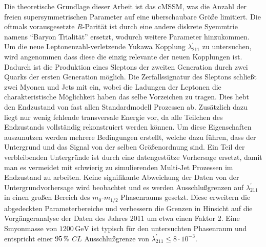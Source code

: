 \documentclass[11pt,a4paper,twoside,openright,DIV=13,BCOR=1cm]{scrbook} %
\numberwithin{equation}{chapter} %
\numberwithin{figure}{chapter} %
\numberwithin{table}{chapter} %
\newcommand{\pct}{\scalebox{.9}{\%}}
\begin{document}
Die theoretische Grundlage dieser Arbeit ist das cMSSM, was die Anzahl der freien supersymmetrischen Parameter auf eine überschaubare Größe limitiert. Die oftmals vorausgesetzte $R$-Parität ist durch eine andere diskrete Syemmtrie namens ``Baryon Trialität'' ersetzt, wodurch weitere Parameter hinzukommen. Um die neue Leptonenzahl-verletzende Yukawa Kopplung $\lambda^\prime_{211}$ zu untersuchen, wird angenommen dass diese die einzig relevante der neuen Kopplungen ist. Dadurch ist die Produktion eines Sleptons der zweiten Generation durch zwei Quarks der ersten Generation möglich. Die Zerfallssignatur des Sleptons schließt zwei Myonen und Jets mit ein, wobei die Ladungen der Leptonen die charakteristische Möglichkeit haben das selbe Vorzeichen zu tragen. Dies hebt den Endzustand von fast allen Standardmodell Prozessen ab. Zusätzlich dazu liegt nur wenig fehlende transversale Energie vor, da alle Teilchen des Endzustands vollständig rekonstruiert werden können. Um diese Eigenschaften auszunutzen werden mehrere Bedingungen erstellt, welche dazu führen, dass der Untergrund und das Signal von der selben Größenordnung sind. Ein Teil der verbleibenden Untergründe ist durch eine datengestütze Vorhersage  ersetzt, damit man es vermeidet mit schwierig zu simulierenden Multi-Jet Prozessen im Endzustand zu arbeiten. Keine signifikante Abweichung der Daten von der Untergrundvorhersage wird beobachtet und es werden Ausschlußgrenzen auf $\lambda^\prime_{211}$ in einen großen Bereich des $m_0$-$m_{1/2}$ Phasenraums gesetzt. Diese erweitern die abgedeckten Parameterbereiche und verbessern die Grenzen in Hinsicht auf die Vorgängeranalyse der Daten des Jahres 2011 um etwa einen Faktor 2. Eine Smyonmasse von $1200\,\text{GeV}$ ist typisch für den untersuchten Phasenraum und entspricht einer $95\,\pct$ $CL$ Ausschlußgrenze von $\lambda^\prime_{211} \leq 8 \cdot 10^{-3}$.



\newpage
\tableofcontents














\appendix

% 



\printbibliography[heading=bibintoc]
\end{document}
